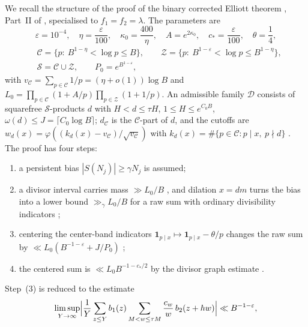 \documentclass[preprint,12pt]{elsarticle}
\numberwithin{equation}{section}
\theoremstyle{plain}
\theoremstyle{definition}
\theoremstyle{definition}
\theoremstyle{remark}
\begin{document}
We recall the structure of the proof of the binary corrected Elliott theorem \cite[Theorem~1.2, p.~4]{OpenAI2026}, Part~II of \cite{OpenAI2026}, specialised to $f_1=f_2=\lambda$. The parameters are \cite[(10.1)--(10.2), p.~44]{OpenAI2026}
\begin{equation}
\varepsilon=10^{-4},\quad \eta=\frac{\varepsilon}{100},\quad \kappa_0=\frac{400}{\eta},\quad A=e^{2\kappa_0},\quad c_*=\frac{\varepsilon}{100},\quad \theta=\frac14,
\label{eq:oai_params}
\end{equation}
\begin{equation}
\begin{aligned}
&\mathcal C=\{p:\ B^{1-\eta}<\log p\le B\},\qquad \mathcal Z=\{p:\ B^{1-\varepsilon}<\log p\le B^{1-\eta}\},\\
&\mathcal S=\mathcal C\cup\mathcal Z,\qquad P_0=e^{B^{1-\varepsilon}},
\end{aligned}
\label{eq:oai_primes}
\end{equation}
with $v_{\mathcal C}=\sum_{p\in\mathcal C}1/p=(\eta+o(1))\log B$ and $L_0=\prod_{p\in\mathcal C}(1+A/p)\prod_{p\in\mathcal Z}(1+1/p)$. An admissible family $\mathcal D$ consists of squarefree $\mathcal S$-products $d$ with $H<d\le\tau H$, $1\le H\le e^{C_0B}$, $\omega(d)\le J=\lceil C_0\log B\rceil$; $d_{\mathcal C}$ is the $\mathcal C$-part of $d$, and the cutoffs are $w_d(x)=\varphi((k_d(x)-v_{\mathcal C})/\sqrt{v_{\mathcal C}})$ with $k_d(x)=\#\{p\in\mathcal C:p\mid x,\ p\nmid d\}$ \cite[(10.3)--(10.4), (11.3), pp.~45--47]{OpenAI2026}. The proof has four steps:
\begin{enumerate}
\item a persistent bias $|S(N_j)|\ge\gamma N_j$ is assumed;
\item a divisor interval carries mass $\gg L_0/B$ \cite[Lemma~11.2, p.~47]{OpenAI2026}, and dilation $x=dm$ turns the bias into a lower bound $\gg_\gamma L_0/B$ for a raw sum with ordinary divisibility indicators \cite[Lemma~11.3, p.~48]{OpenAI2026};
\item centering the center-band indicators $\mathbf 1_{p\mid x}\mapsto\mathbf 1_{p\mid x}-\theta/p$ changes the raw sum by $\ll L_0(B^{-1-\varepsilon}+J/P_0)$ \cite[Proposition~11.4, p.~49]{OpenAI2026};
\item the centered sum is $\ll L_0B^{-1-c_*/2}$ by the divisor graph estimate \cite[Proposition~10.1, p.~45]{OpenAI2026}.
\end{enumerate}
Step~(3) is reduced \cite[\S12.1, pp.~50--51]{OpenAI2026} to the estimate
\begin{equation}
\limsup_{Y\to\infty}\Bigl|\frac1Y\sum_{z\le Y}b_1(z)\sum_{M<w\le\tau M}\frac{c_w}{w}\,b_2(z+hw)\Bigr|\ll B^{-1-\varepsilon},
\label{eq:oai124}
\end{equation}
\end{document}

